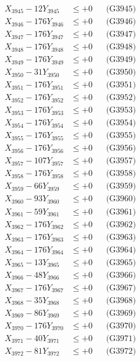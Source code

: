 \documentclass[a4paper,10pt]{article}
\begin{document}
{\begin{align}
X_{3945} - 12Y_{3945} &\leq +0 && \text{(G3945)} \\
X_{3946} - 176Y_{3946} &\leq +0 && \text{(G3946)} \\
X_{3947} - 176Y_{3947} &\leq +0 && \text{(G3947)} \\
X_{3948} - 176Y_{3948} &\leq +0 && \text{(G3948)} \\
X_{3949} - 176Y_{3949} &\leq +0 && \text{(G3949)} \\
X_{3950} - 31Y_{3950} &\leq +0 && \text{(G3950)} \\
\allowbreak
X_{3951} - 176Y_{3951} &\leq +0 && \text{(G3951)} \\
X_{3952} - 176Y_{3952} &\leq +0 && \text{(G3952)} \\
X_{3953} - 176Y_{3953} &\leq +0 && \text{(G3953)} \\
X_{3954} - 176Y_{3954} &\leq +0 && \text{(G3954)} \\
X_{3955} - 176Y_{3955} &\leq +0 && \text{(G3955)} \\
X_{3956} - 176Y_{3956} &\leq +0 && \text{(G3956)} \\
X_{3957} - 107Y_{3957} &\leq +0 && \text{(G3957)} \\
X_{3958} - 176Y_{3958} &\leq +0 && \text{(G3958)} \\
X_{3959} - 66Y_{3959} &\leq +0 && \text{(G3959)} \\
X_{3960} - 93Y_{3960} &\leq +0 && \text{(G3960)} \\
\allowbreak
X_{3961} - 59Y_{3961} &\leq +0 && \text{(G3961)} \\
X_{3962} - 176Y_{3962} &\leq +0 && \text{(G3962)} \\
X_{3963} - 176Y_{3963} &\leq +0 && \text{(G3963)} \\
X_{3964} - 176Y_{3964} &\leq +0 && \text{(G3964)} \\
X_{3965} - 13Y_{3965} &\leq +0 && \text{(G3965)} \\
X_{3966} - 48Y_{3966} &\leq +0 && \text{(G3966)} \\
X_{3967} - 176Y_{3967} &\leq +0 && \text{(G3967)} \\
X_{3968} - 35Y_{3968} &\leq +0 && \text{(G3968)} \\
X_{3969} - 86Y_{3969} &\leq +0 && \text{(G3969)} \\
X_{3970} - 176Y_{3970} &\leq +0 && \text{(G3970)} \\
\allowbreak
X_{3971} - 40Y_{3971} &\leq +0 && \text{(G3971)} \\
X_{3972} - 81Y_{3972} &\leq +0 && \text{(G3972)} \\

\end{align}}
\end{document}
